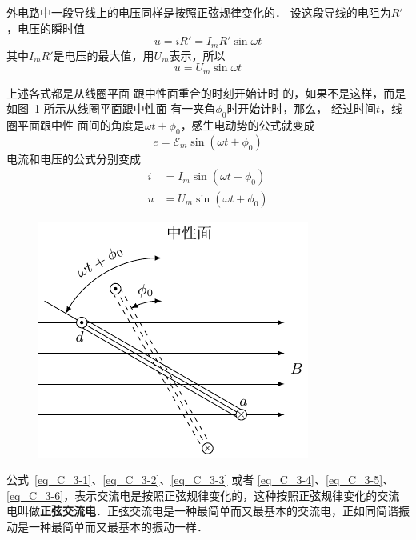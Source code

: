 外电路中一段导线上的电压同样是按照正弦规律变化的．
设这段导线的电阻为$R'$，电压的瞬时值
\[u=iR'=I_mR'\sin\omega t \]
其中$I_mR'$是电压的最大值，用$U_m$表示，所以
\begin{equation}\label{eq_C_3-3}
    u=U_m \sin\omega t
\end{equation}



上述各式都是从线圈平面
跟中性面重合的时刻开始计时
的，如果不是这样，而是如图~\ref{fig_C_3-3} 所示从线圈平面跟中性面
有一夹角$\phi_0$时开始计时，那么，
经过时间$t$，线圈平面跟中性
面间的角度是$\omega t+\phi_0$，感生电动势的公式就变成
\begin{equation}\label{eq_C_3-4}
    e=\mathcal{E}_m \sin (\omega t+\phi_0)
\end{equation}
电流和电压的公式分别变成
\begin{align}
    i&=I_m\sin (\omega t+\phi_0) \label{eq_C_3-5}\\
    u&=U_m\sin (\omega t+\phi_0)\label{eq_C_3-6}
\end{align}

\begin{figure}[htbp]
	\centering
	\includegraphics{fig/C/3-3.pdf}
	\caption{}\label{fig_C_3-3}
\end{figure}


公式~\eqref{eq_C_3-1}、\eqref{eq_C_3-2}、\eqref{eq_C_3-3} 或者 \eqref{eq_C_3-4}、\eqref{eq_C_3-5}、\eqref{eq_C_3-6}，表示交流电是按照正弦规律变化的，这种按照正弦规律变化的交流电叫做\textbf{正弦交流电}．正弦交流电是一种最简单而又最基本的交流电，正如同简谐振动是一种最简单而又最基本的振动一样．
	
